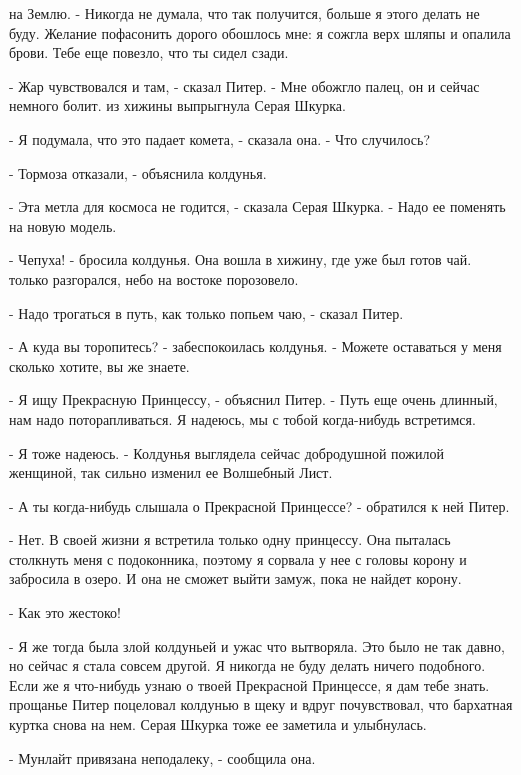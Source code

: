 на Землю. - Никогда не думала, что так получится, больше я этого 
делать не буду. Желание пофасонить дорого обошлось мне: я сожгла верх 
шляпы и опалила брови. Тебе еще повезло, что ты сидел сзади.
\par- Жар чувствовался и там, - сказал Питер. - Мне обожгло палец, он 
и сейчас немного болит.
 из хижины выпрыгнула Серая Шкурка.
\par- Я подумала, что это падает комета, - сказала она. - Что 
случилось?
\par- Тормоза отказали, - объяснила колдунья.
\par- Эта метла для космоса не годится, - сказала Серая Шкурка. - Надо 
ее поменять на новую модель.
\par- Чепуха! - бросила колдунья. Она вошла в хижину, где уже был 
готов чай.
 только разгорался, небо на востоке порозовело.
\par- Надо трогаться в путь, как только попьем чаю, - сказал Питер.
\par- А куда вы торопитесь? - забеспокоилась колдунья. - Можете 
оставаться у меня сколько хотите, вы же знаете.
\par- Я ищу Прекрасную Принцессу, - объяснил Питер. - Путь еще очень 
длинный, нам надо поторапливаться. Я надеюсь, мы с тобой когда-нибудь 
встретимся.
\par- Я тоже надеюсь. - Колдунья выглядела сейчас добродушной пожилой 
женщиной, так сильно изменил ее Волшебный Лист.
\par- А ты когда-нибудь слышала о Прекрасной Принцессе? - обратился к 
ней Питер.
\par- Нет. В своей жизни я встретила только одну принцессу. Она 
пыталась столкнуть меня с подоконника, поэтому я сорвала у нее с 
головы корону и забросила в озеро. И она не сможет выйти замуж, пока 
не найдет корону.
\par- Как это жестоко!
\par- Я же тогда была злой колдуньей и ужас что вытворяла. Это было не 
так давно, но сейчас я стала совсем другой. Я никогда не буду делать 
ничего подобного. Если же я что-нибудь узнаю о твоей Прекрасной 
Принцессе, я дам тебе знать.
 прощанье Питер поцеловал колдунью в щеку и вдруг почувствовал, 
что бархатная куртка снова на нем. Серая Шкурка тоже ее заметила и 
улыбнулась.
\par- Мунлайт привязана неподалеку, - сообщила она.
